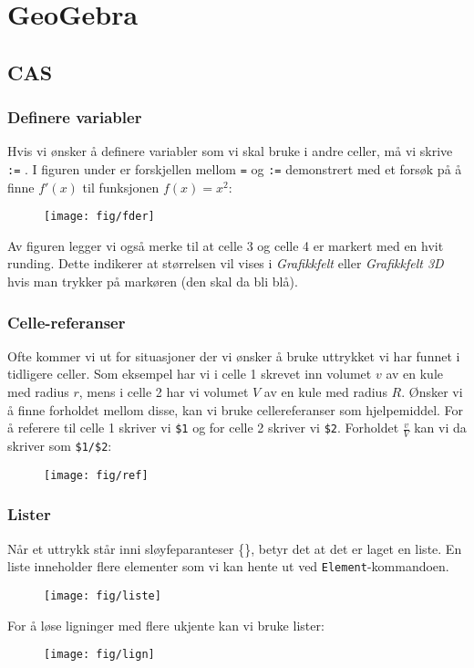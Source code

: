 




\section{GeoGebra}	
\subsection{CAS}	
\subsubsection{Definere variabler \label{defvar}}
Hvis vi ønsker å definere variabler som vi skal bruke i andre celler, må vi skrive \texttt{:=} . I figuren under er forskjellen mellom \texttt{=} og \texttt{:=} demonstrert med et forsøk på å finne $ f'(x) $ til funksjonen $ f(x)=x^2 $:
\begin{figure}
	\centering
	\texttt{[image: fig/fder]}
\end{figure}
Av figuren legger vi også merke til at celle 3 og celle 4 er markert med en hvit runding. Dette indikerer at størrelsen vil vises i \textsl{Grafikkfelt} eller \textsl{Grafikkfelt 3D} hvis man trykker på markøren (den skal da bli blå).
\subsubsection{Celle-referanser}

Ofte kommer vi ut for situasjoner der vi ønsker å bruke uttrykket vi har funnet i tidligere celler. Som eksempel har vi i celle 1 skrevet inn volumet $ v $ av en kule med radius $ r $, mens i celle 2 har vi volumet $ V $ av en kule med radius $ R $. Ønsker vi å finne forholdet mellom disse, kan vi bruke cellereferanser som hjelpemiddel. For å referere til celle 1 skriver vi \texttt{\$1} og for celle 2 skriver vi \texttt{\$2}. Forholdet $ \frac{v}{V} $ kan vi da skriver som \texttt{\$1/\$2}:
\begin{figure}
	\centering
	\texttt{[image: fig/ref]}
\end{figure}

\subsubsection{Lister}
Når et uttrykk står inni sløyfeparanteser \{\}, betyr det at det er laget en liste. En liste inneholder flere elementer som vi kan hente ut ved \texttt{Element}-kommandoen.
\begin{figure}
	\centering
	\texttt{[image: fig/liste]}
\end{figure}
For å løse ligninger med flere ukjente kan vi bruke lister:
\begin{figure}
	\centering
	\texttt{[image: fig/lign]}
\end{figure}
